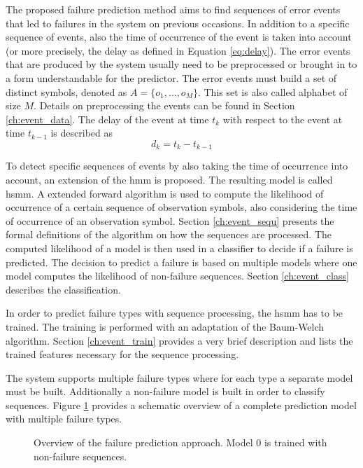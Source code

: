 \documentclass[mscthesis]{usiinfthesis}
\begin{document}
The proposed failure prediction method aims to find sequences of error events
that led to failures in the system on previous occasions. In addition to
a specific sequence of events, also the time of occurrence of the event is taken
into account (or more precisely, the delay as defined in Equation
\ref{eq:delay}). The error events that are produced by the system usually need
to be preprocessed or brought in to a form understandable for the predictor.
The error events must build a set of distinct symbols, denoted as $A=\{o_1,
\dots, o_M\}$. This set is also called alphabet of size $M$. Details on
preprocessing the events can be found in Section \ref{ch:event_data}. The
delay of the event at time $ t_k $ with respect to the event at time $ t_{k-1}
$ is described as
\begin{equation}
\label{eq:delay}
    d_k = t_k-t_{k-1}
\end{equation}

To detect specific sequences of events by also taking the time of occurrence
into account, an extension of the \gls{hmm} is proposed. The resulting model is
called \acrfull{hsmm}. A extended forward algorithm is used to compute the
likelihood of occurrence of a certain sequence of observation symbols, also
considering the time of occurrence of an observation symbol. Section
\ref{ch:event_sequ} presents the formal definitions of the algorithm on how the
sequences are processed. The computed likelihood of a model is then used in
a classifier to decide if a failure is predicted. The decision to predict
a failure is based on multiple models where one model computes the likelihood
of non-failure sequences. Section \ref{ch:event_class} describes the
classification.

In order to predict failure types with sequence processing, the \gls{hsmm} has
to be trained. The training is performed with an adaptation of the Baum-Welch
algorithm. Section \ref{ch:event_train} provides a very brief description and
lists the trained features necessary for the sequence processing.

The system supports multiple failure types where for each type a separate
model must be built. Additionally a non-failure model is built in order to
classify sequences. Figure \ref{fig:model} provides a schematic overview of
a complete prediction model with multiple failure types.

\begin{figure}
    \centering
    
    \caption{Overview of the failure prediction approach. Model 0 is trained
        with non-failure sequences.}
    \label{fig:model}
\end{figure}
\end{document}
